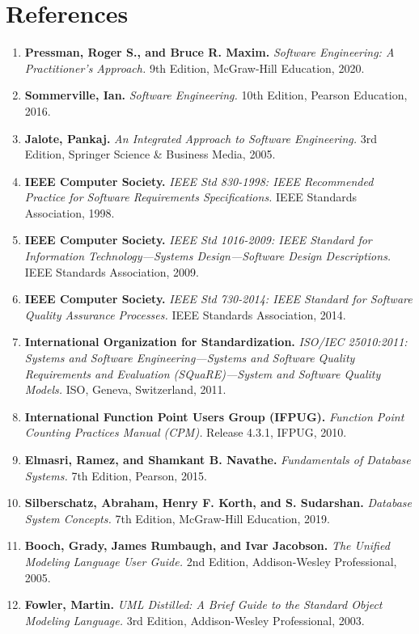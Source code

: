 \section{References}

\begin{enumerate}
  \item \textbf{Pressman, Roger S., and Bruce R. Maxim.} \textit{Software Engineering: A Practitioner's Approach.} 9th Edition, McGraw-Hill Education, 2020.
  \item \textbf{Sommerville, Ian.} \textit{Software Engineering.} 10th Edition, Pearson Education, 2016.
  \item \textbf{Jalote, Pankaj.} \textit{An Integrated Approach to Software Engineering.} 3rd Edition, Springer Science \& Business Media, 2005.
  \item \textbf{IEEE Computer Society.} \textit{IEEE Std 830-1998: IEEE Recommended Practice for Software Requirements Specifications.} IEEE Standards Association, 1998.
  \item \textbf{IEEE Computer Society.} \textit{IEEE Std 1016-2009: IEEE Standard for Information Technology—Systems Design—Software Design Descriptions.} IEEE Standards Association, 2009.
  \item \textbf{IEEE Computer Society.} \textit{IEEE Std 730-2014: IEEE Standard for Software Quality Assurance Processes.} IEEE Standards Association, 2014.
  \item \textbf{International Organization for Standardization.} \textit{ISO/IEC 25010:2011: Systems and Software Engineering—Systems and Software Quality Requirements and Evaluation (SQuaRE)—System and Software Quality Models.} ISO, Geneva, Switzerland, 2011.
  \item \textbf{International Function Point Users Group (IFPUG).} \textit{Function Point Counting Practices Manual (CPM).} Release 4.3.1, IFPUG, 2010.
  \item \textbf{Elmasri, Ramez, and Shamkant B. Navathe.} \textit{Fundamentals of Database Systems.} 7th Edition, Pearson, 2015.
  \item \textbf{Silberschatz, Abraham, Henry F. Korth, and S. Sudarshan.} \textit{Database System Concepts.} 7th Edition, McGraw-Hill Education, 2019.
  \item \textbf{Booch, Grady, James Rumbaugh, and Ivar Jacobson.} \textit{The Unified Modeling Language User Guide.} 2nd Edition, Addison-Wesley Professional, 2005.
  \item \textbf{Fowler, Martin.} \textit{UML Distilled: A Brief Guide to the Standard Object Modeling Language.} 3rd Edition, Addison-Wesley Professional, 2003.
\end{enumerate}
